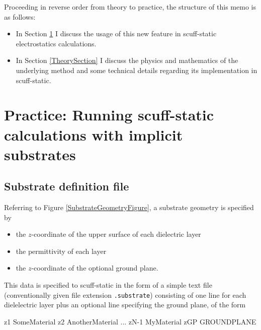 \documentclass[letterpaper]{article}
\begin{document}
Proceeding in reverse order from theory to practice, the 
structure of this memo is as follows:

\begin{itemize}
\item 
In Section \ref{ImplementationSection} I discuss the usage
of this new feature in {\sc scuff-static} electrostatics calculations.

\item 
In Section \ref{TheorySection} I discuss the physics and
mathematics of the underlying method and some technical details
regarding its implementation in {\sc scuff-static}.
\end{itemize}

\newpage
\section{Practice: Running {\sc scuff-static} calculations
         with implicit substrates}
\label{ImplementationSection}

\subsection{Substrate definition file}

Referring to Figure \ref{SubstrateGeometryFigure},
a substrate geometry is specified by
\begin{itemize}
 \item the $z$-coordinate of the upper surface of each dielectric layer
 \item the permittivity of each layer
 \item the $z$-coordinate of the optional ground plane.
\end{itemize}

This data is specified to {\sc scuff-static} in the
form of a simple text file (conventionally given file
extension \texttt{.substrate}) consisting of one line for each
dielelectric layer plus an optional line specifying the ground 
plane, of the form

\medskip

\begin{verbcode}
z1    SomeMaterial
z2    AnotherMaterial
...
zN-1  MyMaterial
zGP   GROUNDPLANE
\end{verbcode}
\end{document}
